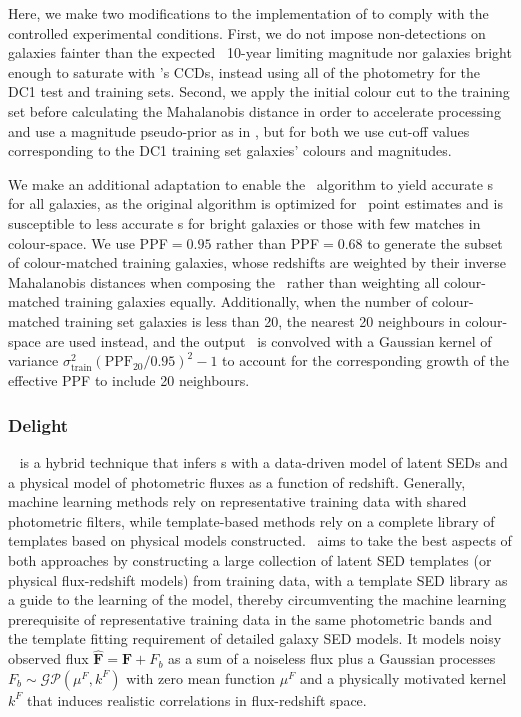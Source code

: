 Here, we make two modifications to the implementation of \citet{Graham:17} to comply with the controlled experimental conditions.
First, we do not impose non-detections on galaxies fainter than the expected \lsst\ 10-year limiting magnitude nor galaxies bright enough to saturate with \lsst's CCDs, instead using all of the photometry for the DC1 test and training sets.
Second, we apply the initial colour cut to the training set before calculating the Mahalanobis distance in order to accelerate processing and use a magnitude pseudo-prior as in \citet{Graham:17}, but for both we use cut-off values corresponding to the DC1 training set galaxies' colours and magnitudes.

We make an additional adaptation to enable the \cmnn\ algorithm to yield accurate \pzpdf s for all galaxies, as the original \citet{Graham:17} algorithm is optimized for \pz\ point estimates and is susceptible to less accurate \pzpdf s for bright galaxies or those with few matches in colour-space.
We use PPF$=0.95$ rather than PPF$=0.68$ to generate the subset of colour-matched training galaxies, whose redshifts are weighted by their inverse Mahalanobis distances when composing the \pzpdf\ rather than weighting all colour-matched training galaxies equally.
Additionally, when the number of colour-matched training set galaxies is less than 20, the nearest 20 neighbours in colour-space are used instead, and the output \pzpdf\ is convolved with a Gaussian kernel of variance $\sigma_{\mathrm{ train}}^{2}(\mathrm{PPF}_{20}/0.95)^2 -1$ to account for the corresponding growth of the effective PPF to include 20 neighbours.

\subsubsection{Delight}
\label{sec:delight}

\delight\ \citep{Leistedt:17} is a hybrid technique that infers \pz s with a data-driven model of latent SEDs and a physical model of photometric fluxes as a function of redshift.
Generally, machine learning methods rely on representative training data with shared photometric filters, while template-based methods rely on a complete library of templates based on physical models constructed.
\delight\ aims to take the best aspects of both approaches by constructing a large collection of latent SED templates (or physical flux-redshift models) from training data, with a template SED library as a guide to the learning of the model, thereby circumventing the machine learning prerequisite of representative training data in the same photometric bands and the template fitting requirement of detailed galaxy SED models.
It models noisy observed flux $\mathbf{\hat{F}} = \mathbf{F} + F_{b}$ as a sum of a noiseless flux plus a Gaussian processes $F_b \sim \mathcal{GP}\left(\mu^F, k^F \right)$ with zero mean function $\mu^{F}$ and a physically motivated kernel $k^{F}$ that induces realistic correlations in flux-redshift space.

